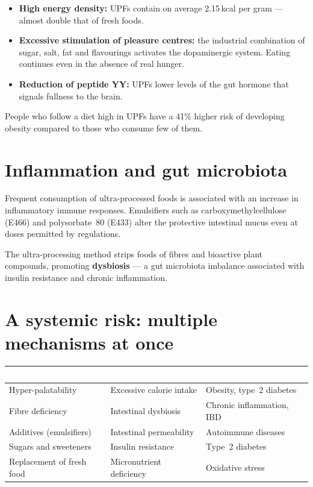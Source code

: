 \documentclass[a5paper,12pt,oneside,openany]{book}
\newcommand{\boxred}[2]{%
  \begin{tcolorbox}[boxbase,
    colback=warnred!8!white, colframe=warnred, title={#1}]
  #2\end{tcolorbox}}
\begin{document}
\begin{itemize}
  \item \textbf{High energy density:} UPFs contain on average
    2.15\,kcal per gram --- almost double that of fresh foods.
  \item \textbf{Excessive stimulation of pleasure centres:} the industrial
    combination of sugar, salt, fat and flavourings activates the
    dopaminergic system. Eating continues even in the absence of real
    hunger.
  \item \textbf{Reduction of peptide YY:} UPFs lower levels of the gut
    hormone that signals fullness to the brain.
\end{itemize}

\boxred{+41\% risk of abdominal obesity}{People who follow a diet high in
UPFs have a 41\% higher risk of developing obesity compared to those who
consume few of them.}

\section{Inflammation and gut microbiota}

Frequent consumption of ultra-processed foods is associated with an
increase in inflammatory immune responses. Emulsifiers such as
carboxymethylcellulose (E466) and polysorbate~80 (E433) alter the
protective intestinal mucus even at doses permitted by regulations.

The ultra-processing method strips foods of fibres and bioactive plant
compounds, promoting \textbf{dysbiosis} --- a gut microbiota imbalance
associated with insulin resistance and chronic inflammation.

\section{A systemic risk: multiple mechanisms at once}

{\small
\begin{tabularx}{\textwidth}{|L|L|L|}
\hline
{}
\textcolor{white}{\textbf{Mechanism}}
  & \textcolor{white}{\textbf{Effect}}
  & \textcolor{white}{\textbf{Consequence}} \\
\hline
Hyper-palatability & Excessive calorie intake & Obesity, type~2 diabetes \\
\hline
Fibre deficiency & Intestinal dysbiosis & Chronic inflammation, IBD \\
\hline
Additives (emulsifiers) & Intestinal permeability & Autoimmune diseases \\
\hline
Sugars and sweeteners & Insulin resistance & Type~2 diabetes \\
\hline
Replacement of fresh food & Micronutrient deficiency & Oxidative stress \\
\hline
\end{tabularx}
}
\end{document}
